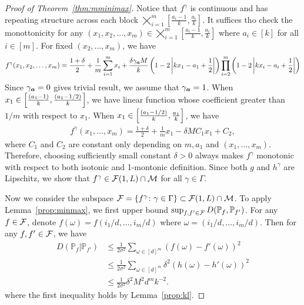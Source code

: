 \documentclass[12pt]{article}
\theoremstyle{definition}
\begin{document}
{\begin{proof}[Proof of Theorem~\ref{thm:mminimax}]
 Notice that $f^{\gamma}$ is continuous and has repeating structure across each block $\bigtimes_{i=1}^m\left[\frac{a_i-1}{k},\frac{a_i}{k}\right]$. It suffices tho check the monottonicity for any  $(x_1,x_2,\ldots,x_m)\in \bigtimes_{i=1}^m\left[\frac{a_i-1}{k},\frac{a_i}{k}\right]$ where $a_i\in[k]$ for all $i\in[m]$. 
 For fixed $(x_2,\ldots,x_m)$, we have
 \begin{align}
     f^{\gamma}(x_1,x_2,\ldots,x_m) =\frac{1+\delta}{2}+ \frac{1}{m}\sum_{i=1}^m x_i+{\delta \gamma_{\bm{a}}M\over k}\left(1-2\left|kx_1-a_1+\frac{1}{2}\right|\right)\prod_{i=2}^m\left(1-2\left|kx_i-a_i+\frac{1}{2}\right|\right)
 \end{align}
 Since $\gamma_{\bm{a}}=0$ gives trivial result, we assume that $\gamma_{\bm{a}} = 1$. When $x_1\in \left[{(a_1-1)\over k},{(a_1-1/2)\over k}\right]$, we have linear function whose coefficient greater than $1/m$ with respect to $x_1$. When $x_1\in \left[{(a_1-1/2)\over k},{a_1\over k}\right]$, we have
 \begin{align}
     f^{\gamma}(x_1,\ldots,x_m) = \frac{1+\delta}{2}+\frac{1}{m}x_1 -\delta M C_1 x_1 + C_2,
 \end{align}
 where $C_1$ and $C_2$ are constant only depending on $m,a_1$ and $(x_1,\ldots,x_m)$. Therefore, choosing sufficiently small constant $\delta>0$  always makes $f^{\gamma}$ monotonic with respect to both isotonic and 1-montonic definition.
  Since both $g$ and  $h^{\gamma}$ are Lipschitz, we show that $f^{\gamma}\in \mathcal{F}(1,L)\cap \mathcal{M}$  for all $\gamma\in\Gamma$.
  
Now we consider the subspace $\mathcal{F}= \{f^{\gamma}\colon \gamma\in\Gamma\}\subset \mathcal{F}(1,L)\cap \mathcal{M}$.  To apply Lemma~\ref{prop:minmax}, we first upper bound $\sup_{f,f'\in \mathcal{F}}D(\mathbb{P}_f,\mathbb{P}_{f'})$.  For any $f\in\mathcal{F}$, denote $f({\omega}) = f(i_1/d,\ldots,i_m/d)$ where $\omega = (i_1/d,\ldots,i_m/d)$. Then for any $f,f'\in\mathcal{F}$, we have
 \begin{align}
    D(\mathbb{P}_f|\mathbb{P}_{f'})&\leq \frac{1}{2\sigma^2}\sum_{\omega\in[d]^m}(f(\omega)-f'(\omega))^2\\&\leq \frac{1}{2\sigma^2}\sum_{\omega\in[d]^m}\delta^2(h(\omega)-h'(\omega))^2\\&\leq \frac{1}{2\sigma^2}\delta^2 M^2 d^m k^{-2}.
\end{align}
where the first inequality holds by Lemma~\ref{prop:kl}.


\end{proof}}
\end{document}
